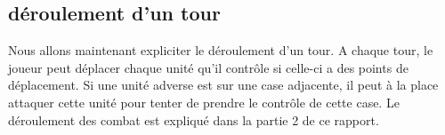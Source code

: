 \subsection{déroulement d'un tour}

Nous allons maintenant expliciter le déroulement d'un tour. A chaque tour, le joueur peut déplacer chaque unité qu'il contrôle si celle-ci a des points de déplacement. Si une unité adverse est sur une case adjacente, il peut à la place attaquer cette unité pour tenter de prendre le contrôle de cette case. Le déroulement des combat est expliqué dans la partie 2 de ce rapport.


